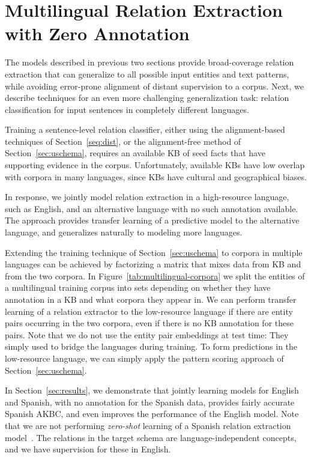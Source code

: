 \section{Multilingual Relation Extraction with Zero Annotation}

\label{sec:multilingual}

The models described in previous two sections provide broad-coverage relation extraction that can generalize to all possible input entities and text patterns, while avoiding error-prone alignment of distant supervision to a corpus. Next, we describe techniques for an even more challenging generalization task: relation classification for input sentences in completely different languages. 


Training a sentence-level relation classifier, either using the alignment-based techniques of Section~\ref{seq:dist}, or the alignment-free method of Section~\ref{sec:uschema}, requires an available KB of seed facts that have supporting evidence in the corpus.  Unfortunately, available KBs have low overlap with corpora in many languages, since KBs have cultural and geographical biases. 

In response, we jointly model relation extraction in a high-resource language, such as English, and an alternative language with no such annotation available. The approach provides transfer learning of a predictive model to the alternative language, and generalizes naturally to modeling more languages. 


Extending the training technique of Section~\ref{sec:uschema} to corpora in multiple languages can be achieved by factorizing a matrix that mixes data from KB and from the two corpora. In Figure~\ref{tab:multilingual-corpora} we split the entities of a multilingual training corpus into sets depending on whether they have annotation in a KB and what corpora they appear in. We can perform transfer learning of a relation extractor to the low-resource language if there are entity pairs occurring in the two corpora, even if there is no KB annotation for these pairs. Note that we do not use the entity pair embeddings at test time: They simply used to bridge the languages during training. To form predictions in the low-resource language, we can simply apply the pattern scoring approach of Section~\ref{sec:uschema}. 

In Section~\ref{sec:results}, we demonstrate that jointly learning models for English and Spanish, with no annotation for the Spanish data, provides fairly accurate Spanish AKBC, and even improves the performance of the English model. Note that we are not performing \textit{zero-shot} learning of a Spanish relation extraction model~\citep{zeroshot}. The relations in the target schema are language-independent concepts, and we have supervision for these in English. 

